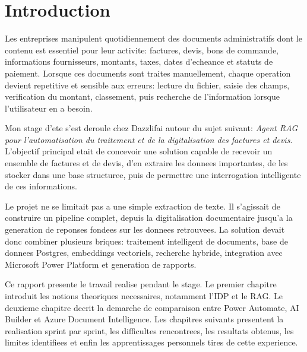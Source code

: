 \chapter*{Introduction}
\label{chap:general_introduction}
%
%

Les entreprises manipulent quotidiennement des documents administratifs dont le contenu est essentiel pour leur activite: factures, devis, bons de commande, informations fournisseurs, montants, taxes, dates d'echeance et statuts de paiement. Lorsque ces documents sont traites manuellement, chaque operation devient repetitive et sensible aux erreurs: lecture du fichier, saisie des champs, verification du montant, classement, puis recherche de l'information lorsque l'utilisateur en a besoin.

Mon stage d'ete s'est deroule chez Dazzlifai autour du sujet suivant: \textit{Agent RAG pour l'automatisation du traitement et de la digitalisation des factures et devis}. L'objectif principal etait de concevoir une solution capable de recevoir un ensemble de factures et de devis, d'en extraire les donnees importantes, de les stocker dans une base structuree, puis de permettre une interrogation intelligente de ces informations.

Le projet ne se limitait pas a une simple extraction de texte. Il s'agissait de construire un pipeline complet, depuis la digitalisation documentaire jusqu'a la generation de reponses fondees sur les donnees retrouvees. La solution devait donc combiner plusieurs briques: traitement intelligent de documents, base de donnees Postgres, embeddings vectoriels, recherche hybride, integration avec Microsoft Power Platform et generation de rapports.

Ce rapport presente le travail realise pendant le stage. Le premier chapitre introduit les notions theoriques necessaires, notamment l'IDP et le RAG. Le deuxieme chapitre decrit la demarche de comparaison entre Power Automate, AI Builder et Azure Document Intelligence. Les chapitres suivants presentent la realisation sprint par sprint, les difficultes rencontrees, les resultats obtenus, les limites identifiees et enfin les apprentissages personnels tires de cette experience.
